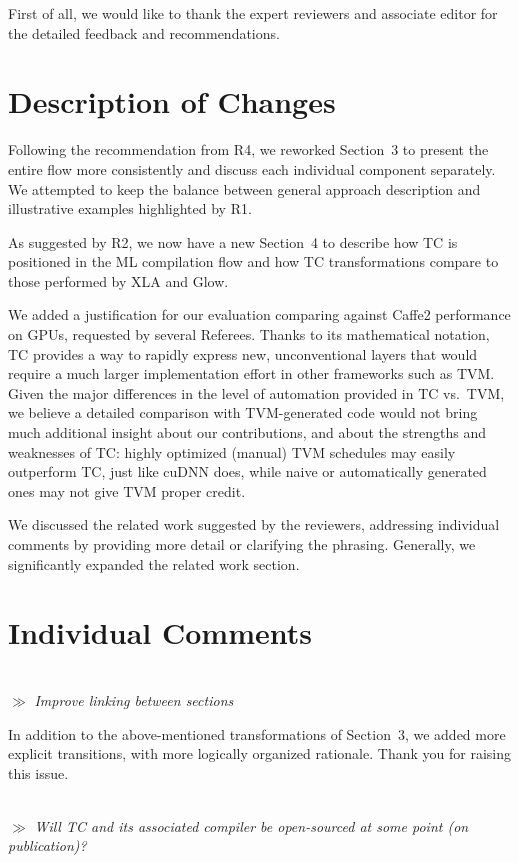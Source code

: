 \documentclass[letterpaper,11pt]{article}
\newcommand{\rev}[1]{~\\[0.5cm]{\tiny $\gg$} {\it #1}}
\begin{document}

First of all, we would like to thank the expert reviewers and associate editor for the detailed feedback and recommendations.

\section*{Description of Changes}

Following the recommendation from R4, we reworked Section~3 to present the
entire flow more consistently and discuss each individual component separately.
We attempted to keep the balance between general approach description and
illustrative examples highlighted by R1.

As suggested by R2, we now have a new Section~4 to describe how TC
is positioned in the ML compilation flow and how TC transformations
compare to those performed by XLA and Glow.

We added a justification for our evaluation comparing against Caffe2
performance on GPUs, requested by several Referees.  Thanks to its
mathematical notation, TC provides a way to rapidly express new,
unconventional layers that would require a much larger implementation
effort in other frameworks such as TVM. Given the major differences in
the level of automation provided in TC vs.\ TVM, we believe a detailed
comparison with TVM-generated code would not bring much additional
insight about our contributions, and about the strengths and
weaknesses of TC: highly optimized (manual) TVM schedules may easily
outperform TC, just like cuDNN does, while naive or automatically
generated ones may not give TVM proper credit.

We discussed the related work suggested by the reviewers, addressing
individual comments by providing more detail or clarifying the
phrasing. Generally, we significantly expanded the related work
section.

\section*{Individual Comments}

\rev{Improve linking between sections}

In addition to the above-mentioned transformations of Section~3, we
added more explicit transitions, with more logically organized
rationale. Thank you for raising this issue.

\rev{Will TC and its associated compiler be open-sourced at some point (on publication)?}
\end{document}
